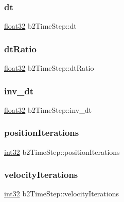 \subsubsection{\texorpdfstring{dt}{dt}}
{\footnotesize\ttfamily \mbox{\hyperlink{b2_settings_8h_aacdc525d6f7bddb3ae95d5c311bd06a1}{float32}} b2\+Time\+Step\+::dt}

\mbox{\label{structb2_time_step_aa67bc8a12ffafce918d9e6a0d8d3f203}} 
\subsubsection{\texorpdfstring{dtRatio}{dtRatio}}
{\footnotesize\ttfamily \mbox{\hyperlink{b2_settings_8h_aacdc525d6f7bddb3ae95d5c311bd06a1}{float32}} b2\+Time\+Step\+::dt\+Ratio}

\mbox{\label{structb2_time_step_ac2d652bde6d303149db9d0a461bc22ba}} 
\subsubsection{\texorpdfstring{inv\_dt}{inv\_dt}}
{\footnotesize\ttfamily \mbox{\hyperlink{b2_settings_8h_aacdc525d6f7bddb3ae95d5c311bd06a1}{float32}} b2\+Time\+Step\+::inv\+\_\+dt}

\mbox{\label{structb2_time_step_ab7938eec17a1a3d7961d8364e150f1be}} 
\subsubsection{\texorpdfstring{positionIterations}{positionIterations}}
{\footnotesize\ttfamily \mbox{\hyperlink{b2_settings_8h_a43d43196463bde49cb067f5c20ab8481}{int32}} b2\+Time\+Step\+::position\+Iterations}

\mbox{\label{structb2_time_step_a9f2a0ccd8029681f254003b66f201ce1}} 
\subsubsection{\texorpdfstring{velocityIterations}{velocityIterations}}
{\footnotesize\ttfamily \mbox{\hyperlink{b2_settings_8h_a43d43196463bde49cb067f5c20ab8481}{int32}} b2\+Time\+Step\+::velocity\+Iterations}


